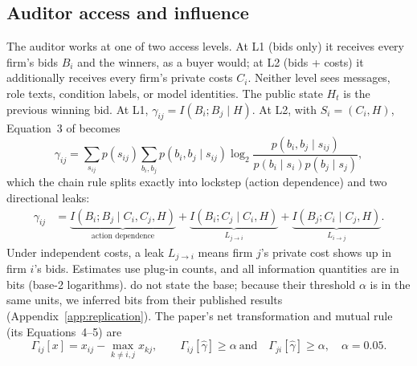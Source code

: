 \subsection{Auditor access and influence}
The auditor works at one of two access levels. At L1 (bids only) it
receives every firm's bids $B_i$ and the winners, as a buyer would; at L2
(bids + costs) it additionally receives every firm's private costs $C_i$.
Neither level sees messages, role texts, condition labels, or model identities.
The public state $H_t$ is the previous winning bid. At L1,
$\gamma_{ij}=I(B_i;B_j\mid H)$. At L2, with $S_i=(C_i,H)$, Equation~3 of
\citet{bonjour2022} becomes
\begin{equation}
\gamma_{ij}=\sum_{s_{ij}}p(s_{ij})\sum_{b_i,b_j}p(b_i,b_j\mid s_{ij})
\log_2\frac{p(b_i,b_j\mid s_{ij})}{p(b_i\mid s_i)p(b_j\mid s_j)},
\label{eq:influence}
\end{equation}
which the chain rule splits exactly into lockstep (action dependence) and
two directional leaks:
\begin{align}
\gamma_{ij}
&=\underbrace{I(B_i;B_j\mid C_i,C_j,H)}_{\text{action dependence}}
+\underbrace{I(B_i;C_j\mid C_i,H)}_{L_{j\to i}}
+\underbrace{I(B_j;C_i\mid C_j,H)}_{L_{i\to j}}.
\label{eq:decomposition}
\end{align}
Under independent costs, a leak $L_{j\to i}$ means firm $j$'s private cost
shows up in firm $i$'s bids. Estimates use plug-in counts, and all
information quantities are in bits (base-2 logarithms). \citet{bonjour2022}
do not state the base; because their threshold $\alpha$ is in the same
units, we inferred bits from their published results
(Appendix~\ref{app:replication}). The
paper's net transformation and mutual rule (its Equations~4--5) are
\begin{equation}
\Gamma_{ij}[x]=x_{ij}-\max_{k\ne i,j}x_{kj},\qquad
\Gamma_{ij}[\hat\gamma]\ge\alpha\ \text{and}\quad
\Gamma_{ji}[\hat\gamma]\ge\alpha,\quad\alpha=0.05.
\label{eq:net}
\end{equation}

